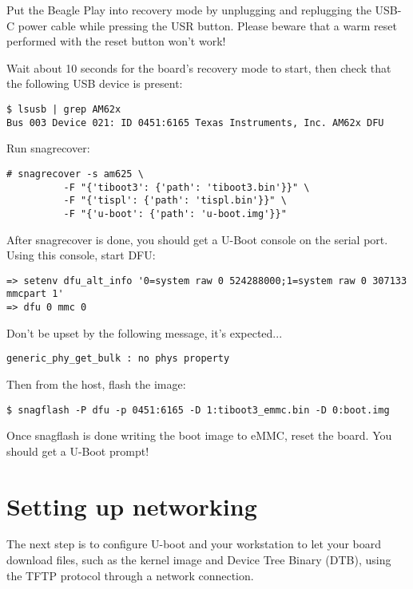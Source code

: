Put the Beagle Play into recovery mode by unplugging and replugging the USB-C power
cable while pressing the USR button. Please beware that a warm reset performed
with the reset button won't work!

Wait about 10 seconds for the board's recovery mode to start, then check that
the following USB device is present:

\begin{verbatim}
$ lsusb | grep AM62x
Bus 003 Device 021: ID 0451:6165 Texas Instruments, Inc. AM62x DFU
\end{verbatim}

Run snagrecover:

\begin{verbatim}
# snagrecover -s am625 \
          -F "{'tiboot3': {'path': 'tiboot3.bin'}}" \
          -F "{'tispl': {'path': 'tispl.bin'}}" \
          -F "{'u-boot': {'path': 'u-boot.img'}}"
\end{verbatim}

After snagrecover is done, you should get a U-Boot console on the serial port.
Using this console, start DFU:

\begin{verbatim}
=> setenv dfu_alt_info '0=system raw 0 524288000;1=system raw 0 307133 mmcpart 1'
=> dfu 0 mmc 0
\end{verbatim}

Don't be upset by the following message, it's expected...

\begin{verbatim}
generic_phy_get_bulk : no phys property
\end{verbatim}

Then from the host, flash the image:

\begin{verbatim}
$ snagflash -P dfu -p 0451:6165 -D 1:tiboot3_emmc.bin -D 0:boot.img
\end{verbatim}

Once snagflash is done writing the boot image to eMMC, reset the board. You
should get a U-Boot prompt!


\section{Setting up networking}

The next step is to configure U-boot and your workstation to let your
board download files, such as the kernel image and Device Tree Binary
(DTB), using the TFTP protocol through a network connection.

